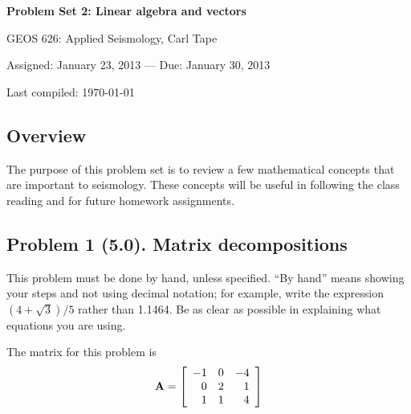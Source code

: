 \documentclass[11pt,titlepage,fleqn]{article}
\begin{document}

\begin{center}

{\large \bf Problem Set 2: Linear algebra and vectors}

GEOS 626: Applied Seismology, Carl Tape

Assigned: January 23, 2013 --- Due: January 30, 2013

Last compiled: \today

\end{center}


\subsection*{Overview}

The purpose of this problem set is to review a few mathematical concepts that are important to seismology. These concepts will be useful in following the class reading \citep{SteinWysession,ShearerE2} and for future homework assignments.

\subsection*{Problem 1 (5.0). Matrix decompositions}

This problem must be done by hand, unless specified. ``By hand'' means showing your steps and not using decimal notation; for example, write the expression $(4 +\sqrt{3})/5$ rather than 1.1464.
Be as clear as possible in explaining what equations you are using.

\medskip\noindent
The matrix for this problem is
%
\begin{equation*}
\mbox{${\bf A}$} =  \left[ \begin{array}{rrr}
    -1  &   0  &  -4 \\
     0  &   2  &   1 \\
     1  &   1  &   4 \\
\end{array} \right]
\end{equation*}

\end{document}
